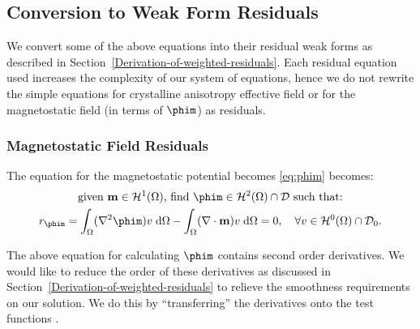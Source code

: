 





\subsection{Conversion to Weak Form Residuals}

We convert some of the above equations into their residual weak forms as described in Section~\ref{Derivation-of-weighted-residuals}. Each residual equation used increases the complexity of our system of equations, hence we do not rewrite the simple equations for crystalline anisotropy effective field or for the magnetostatic field (in terms of $\phim$) as residuals.


\subsubsection{Magnetostatic Field Residuals}
\label{sec:magn-field-resid}

The equation for the magnetostatic potential becomes \eqref{eq:phim} becomes:
\begin{gather}
  \text{given $\mv \in \sob^1(\magd)$, find $\phim \in \sob^2(\magd) \cap \Dfs$ such that:} \notag \\
  r_{\phim} = \int_\magd (\nabla^2 \phim) v  \d \magd
  - \int_\magd (\nabla \cdot \mv) v \d \magd = 0,
  \quad \forall v \in \sob^0(\magd) \cap \Dfs_0. \label{eqn:phires1}
\end{gather}

The above equation for calculating $\phim$ contains second order derivatives.
We would like to reduce the order of these derivatives as discussed in Section~\ref{Derivation-of-weighted-residuals} to relieve the smoothness requirements on our solution.
We do this by ``transferring'' the derivatives onto the test functions \cite{HowardElmanDavidSilvester2006}.

